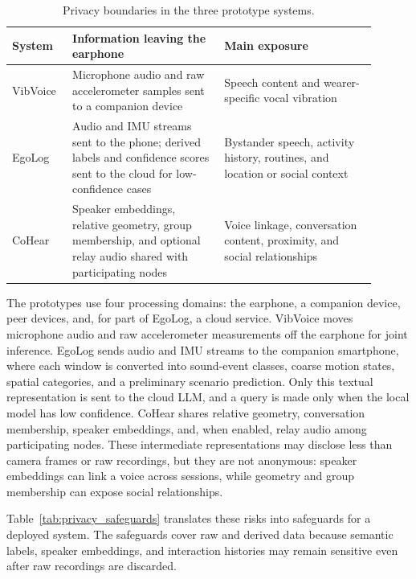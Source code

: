 \documentclass[11pt]{gsasthesis} %
\begin{document}
\begin{table}[htbp]
\centering
\small
\caption{Privacy boundaries in the three prototype systems.}
\label{tab:privacy_boundaries}
\begin{tabular}{p{0.14\linewidth}p{0.38\linewidth}p{0.38\linewidth}}
\toprule
\textbf{System} & \textbf{Information leaving the earphone} & \textbf{Main exposure} \\
\midrule
VibVoice & Microphone audio and raw accelerometer samples sent to a companion device & Speech content and wearer-specific vocal vibration \\
EgoLog & Audio and IMU streams sent to the phone; derived labels and confidence scores sent to the cloud for low-confidence cases & Bystander speech, activity history, routines, and location or social context \\
CoHear & Speaker embeddings, relative geometry, group membership, and optional relay audio shared with participating nodes & Voice linkage, conversation content, proximity, and social relationships \\
\bottomrule
\end{tabular}
\end{table}

The prototypes use four processing domains: the earphone, a companion device, peer devices, and, for part of EgoLog, a cloud service. VibVoice moves microphone audio and raw accelerometer measurements off the earphone for joint inference. EgoLog sends audio and IMU streams to the companion smartphone, where each window is converted into sound-event classes, coarse motion states, spatial categories, and a preliminary scenario prediction. Only this textual representation is sent to the cloud LLM, and a query is made only when the local model has low confidence. CoHear shares relative geometry, conversation membership, speaker embeddings, and, when enabled, relay audio among participating nodes. These intermediate representations may disclose less than camera frames or raw recordings, but they are not anonymous: speaker embeddings can link a voice across sessions, while geometry and group membership can expose social relationships.

Table~\ref{tab:privacy_safeguards} translates these risks into safeguards for a deployed system. The safeguards cover raw and derived data because semantic labels, speaker embeddings, and interaction histories may remain sensitive even after raw recordings are discarded.
\end{document}
